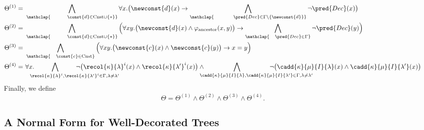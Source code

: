 \begin{align*}
\Theta^{\mathrm{(1)}} =\ &  \bigwedge_{\mathclap{\hspace{6ex}\const{d}\in\mathrm{Cnst}\cup\{ \ast \}}} \forall x.\big( \newconst{d}(x)\rightarrow \bigwedge_{\mathclap{\hspace{7ex}\pred{Dec}\in\Gamma{\setminus}\{ \newconst{d} \}}} \lnot\pred{Dec}(x) \big)\\
%
\Theta^{\mathrm{(2)}} =\ & \bigwedge_{\mathclap{\hspace{6ex}\const{d}\in\mathrm{Cnst}\cup\{ \ast \}}} \Big(\forall xy. \big(\newconst{d}(x) \wedge \varphi_{\mathrm{ancestor}}(x,y) \big) \rightarrow \bigwedge_{\mathclap{\hspace{2ex}\pred{Dec}\in\Gamma}}\lnot\pred{Dec}(y)\Big)\\
%
\Theta^{\mathrm{(3)}} =\ & \bigwedge_{\mathclap{\hspace{2ex}\const{c}\in\mathrm{Cnst}}} \Big( \forall xy. \big(\newconst{c}(x) \land \newconst{c}(y)\big) \rightarrow x = y \Big)\\
%
\Theta^{\mathrm{(4)}} =\ & \forall x. \hspace{-16ex}\bigwedge_{\hspace{14ex}{\recol{\kappa}{\lambda}^{i},\recol{\kappa}{\lambda'}^{i}\in\Gamma, \lambda\neq\lambda'}}\hspace{-16ex}\lnot\big(\recol{\kappa}{\lambda}^{i}(x)\land \recol{\kappa}{\lambda'}^{i}(x)\big) \land \hspace{-16ex}\bigwedge_{\hspace{14ex}{\cadd{\kappa}{\mu}{I}{\lambda}, \cadd{\kappa}{\mu}{I}{\lambda'}\in\Gamma, \lambda\neq \lambda'}}\hspace{-16ex}\lnot\big(\cadd{\kappa}{\mu}{I}{\lambda}(x) \land \cadd{\kappa}{\mu}{I}{\lambda'}(x)\big)
\end{align*}
Finally, we define 
$$ \Theta = \Theta^{\mathrm{(1)}} \land \Theta^{\mathrm{(2)}} \land \Theta^{\mathrm{(3)}} \land \Theta^{\mathrm{(4)}}.$$

\subsection{A Normal Form for Well-Decorated Trees}
\renewcommand{\disun}{\uplus}

